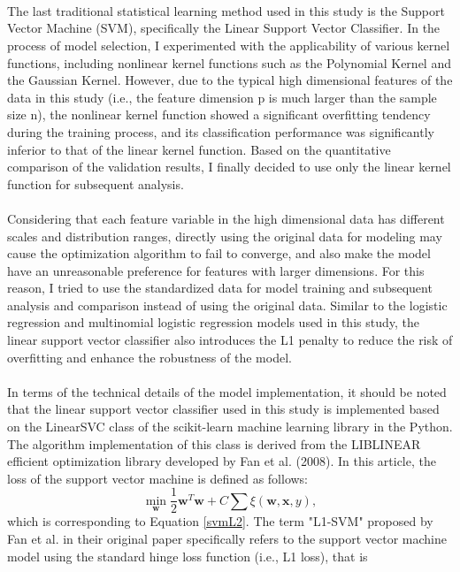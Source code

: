 \\
\\
\\
The last traditional statistical learning method used in this study is the Support Vector Machine (SVM), specifically the Linear Support Vector Classifier. In the process of model selection, I experimented with the applicability of various kernel functions, including nonlinear kernel functions such as the Polynomial Kernel and the Gaussian Kernel. However, due to the typical high dimensional features of the data in this study (i.e., the feature dimension p is much larger than the sample size n), the nonlinear kernel function showed a significant overfitting tendency during the training process, and its classification performance was significantly inferior to that of the linear kernel function. Based on the quantitative comparison of the validation results, I finally decided to use only the linear kernel function for subsequent analysis.\\
\\
Considering that each feature variable in the high dimensional data has different scales and distribution ranges, directly using the original data for modeling may cause the optimization algorithm to fail to converge, and also make the model have an unreasonable preference for features with larger dimensions. For this reason, I tried to use the standardized data for model training and subsequent analysis and comparison instead of using the original data. Similar to the logistic regression and multinomial logistic regression models used in this study, the linear support vector classifier also introduces the L1 penalty to reduce the risk of overfitting and enhance the robustness of the model.\\
\\
In terms of the technical details of the model implementation, it should be noted that the linear support vector classifier used in this study is implemented based on the LinearSVC class of the scikit-learn machine learning library in the Python. The algorithm implementation of this class is derived from the LIBLINEAR efficient optimization library developed by Fan et al. (2008). In this article, the loss of the support vector machine is defined as follows:
$$
\min_{\mathbf{w}}\frac{1}{2} \mathbf{w}^T\mathbf{w}+C\sum\xi(\mathbf{w},\mathbf{x},y),
$$
which is corresponding to Equation \eqref{svmL2}. The term "L1-SVM" proposed by Fan et al. in their original paper specifically refers to the support vector machine model using the standard hinge loss function (i.e., L1 loss), that is
